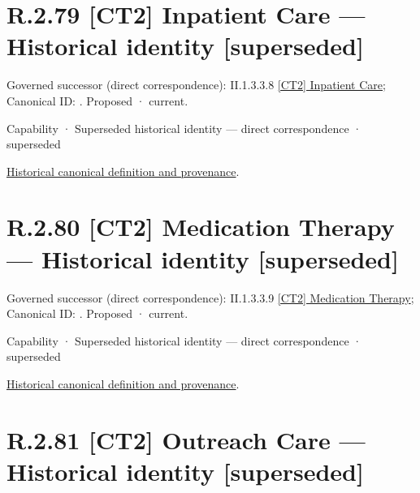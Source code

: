 \section*{R.2.79 [CT2] Inpatient Care — Historical identity [superseded]}
\label{navigation:R.2.79}

{\small Governed successor (direct correspondence): II.1.3.3.8 \hyperref[element:b39fb49c01b545a5b51d3313531efb1b]{[CT2] Inpatient Care}; Canonical ID: \texttt{}. Proposed · current.}\par
\label{element:bcc40a14465e48aca42c9505a6853081}
{\small Capability · Superseded historical identity — direct correspondence · superseded}\par
\href{../../../../../../../continuum/strategy/capability/bcc40a14465e48aca42c9505a6853081.md}{Historical canonical definition and provenance}.\par
\section*{R.2.80 [CT2] Medication Therapy — Historical identity [superseded]}
\label{navigation:R.2.80}

{\small Governed successor (direct correspondence): II.1.3.3.9 \hyperref[element:bb04996164c94e0c827a020432f4e498]{[CT2] Medication Therapy}; Canonical ID: \texttt{}. Proposed · current.}\par
\label{element:db064e0cd4794479be1374e97a3d7e63}
{\small Capability · Superseded historical identity — direct correspondence · superseded}\par
\href{../../../../../../../continuum/strategy/capability/db064e0cd4794479be1374e97a3d7e63.md}{Historical canonical definition and provenance}.\par
\section*{R.2.81 [CT2] Outreach Care — Historical identity [superseded]}
\label{navigation:R.2.81}

